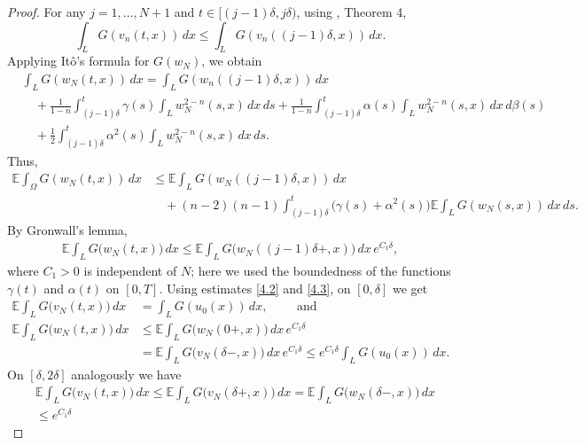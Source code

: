\documentclass[a4paper,12pt]{article}
\numberwithin{equation}{section}
\begin{document}
\begin{proof}
For any $j=1,\dots,N+1$ and $t \in [(j-1)\delta, j\delta)$, using \cite{Bern}, Theorem 4,
\begin{equation}
\int_L G(v_n(t,x))\, dx 
\le \int_L G(v_n((j-1)\delta,x))\, dx.
\label{4.2}
\end{equation}
Applying It\^o's formula for $G(w_N)$, we obtain
\begin{align*}
& \int_L G(w_N(t,x))\, dx
= \int_L G(w_n((j-1)\delta,x))\, dx  \\
&\quad + \frac{1}{1-n}  \int_{(j-1)\delta}^{t} \gamma(s) \int_L 
 w_N^{2-n}(s,x)\, dx\, ds + \frac{1}{1-n}  \int_{(j-1)\delta}^{t} \alpha(s) \int_L 
 w_N^{2-n}(s,x)\, dx\, d \beta(s)  \\
&\quad + \frac{1}{2} \int_{(j-1)\delta}^{t} 
\alpha^2(s) \int_L w_N^{2-n}(s,x)\, dx\, ds.
\end{align*}
Thus,
\begin{align*}
\mathbb{E} \int_\Omega G(w_N(t,x))\, dx
&\le \mathbb{E} \int_L G(w_N((j-1)\delta,x))\, dx  \\
&\quad + (n-2)(n-1) \int_{(j-1)\delta}^{t} 
\bigl(\gamma(s) +  \alpha^2(s)\bigr)
\mathbb{E} \int_L G(w_N(s,x))\, dx\, ds.
\end{align*}
By Gronwall's lemma, 
\begin{align}
\mathbb{E}\int_{L} G\bigl(w_N(t,x)\bigr)\,dx
\le
\mathbb{E}\int_{L} G\bigl(w_N((j-1)\delta+,x)\bigr)\,dx \,
e^{C_1\delta},
\label{4.3}
\end{align}
where $C_1>0$ is independent of $N$; here we used the boundedness of the
functions $\gamma(t)$ and $\alpha(t)$ on $[0,T]$. Using estimates \eqref{4.2} and \eqref{4.3}, on $[0,\delta]$ we get
\begin{align}
\mathbb{E}\int_{L} G\bigl(v_N(t,x)\bigr)\,dx
&=
\int_{L} G(u_0(x))\,dx, \qquad \text{ and }
\label{4.4}
\\
\mathbb{E}\int_{L} G\bigl(w_N(t,x)\bigr)\,dx
&\le
\mathbb{E}\int_{L} G\bigl(w_N(0+,x)\bigr)\,dx \, e^{C_1\delta}
\nonumber\\
&=
\mathbb{E}\int_{L} G\bigl(v_N(\delta-,x)\bigr)\,dx \, e^{C_1\delta}
\le
e^{C_1\delta} \int_{L} G(u_0(x))\,dx.
\label{4.5}
\end{align}
On $[\delta,2\delta]$ analogously we have
\begin{align}
& \mathbb{E}\int_{L} G\bigl(v_N(t,x)\bigr)\,dx
\le
\mathbb{E}\int_{L} G\bigl(v_N(\delta+,x)\bigr)\,dx
=
\mathbb{E}\int_{L} G\bigl(w_N(\delta-,x)\bigr)\,dx
\nonumber\\
&\le
e^{C_1\delta}\,

\end{align}
\end{proof}
\end{document}
